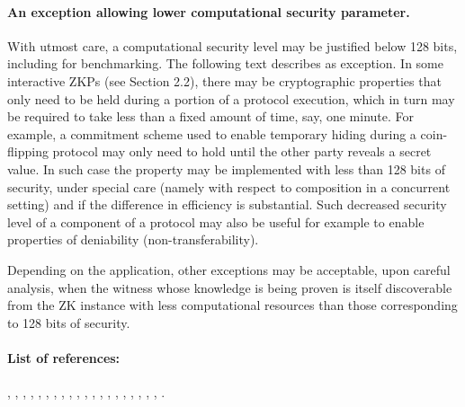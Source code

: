 \paragraph{An exception allowing lower computational security parameter.}
	With utmost care, a computational security level may be justified below 128 bits,
including for benchmarking.
	The following text describes as exception.
	In some interactive ZKPs (see Section 2.2), there may be cryptographic properties that only need to be held during a portion of a protocol execution, which in turn may be required to take less than a fixed amount of time, say, one minute.
	For example, a commitment scheme used to enable temporary hiding during a 
coin-flipping protocol may only need to hold until the other party reveals a secret value.
	In such case the property may be implemented with less than 128 bits of security, 
under special care (namely with respect to composition in a concurrent setting)
and if the difference in efficiency is substantial.
	Such decreased security level of a component of a protocol may also be 
useful for example to enable properties of deniability (non-transferability).

    Depending on the application, other exceptions may be acceptable, upon careful analysis, when the witness whose knowledge is being proven is itself discoverable from the ZK instance with less computational resources than those corresponding to 128 bits of security. 














\paragraph{List of references:}
\cite{2013:tcc:snargs-via-LIPs},
\cite{2016:tcc:IOPs},
\cite{2017:eurocrypt:lattice-based-snargs},
\cite{2016:eurocrypt:efficient-zk-args-for-arithmetic},
\cite{2017:asiacrypt:linear-time-zkps-for-arithmetic},
\cite{2018:asiacrypt:arya-nearly-lineat-time-zkps-for-correct},
\cite{1998:crypto:zkps-for-finite-field-arithmetic},
\cite{2013:QSPs-and-succinct-NIZKs-without-PCPs},
\cite{2015:JACM:delegating-computation-interactive-proofs-for-muggles},
\cite{2010:asiacrypt:short-NIZKPs},
\cite{2018:SP:Doubly-efficient-zkSNARKs-without-trusted-setup},
\cite{2007:stoc:ZK-from-SMPC},
\cite{2012:tcc:On-Efficient-ZK-PCPs},
\cite{1995:crypto:Improved-Efficient-Arguments},
\cite{2008:icalp:interactive-PCP},
\cite{2017:ccs:ligero},
\cite{2000:SIAM:Computationally-Sound-Proofs},
\cite{2016:stoc:Constant-round-Interactive-Proofs-for-Delegating-Computation},
\cite{2018:SP:vRAM},
\cite{2017:SP:vSQL},
\cite{2016:Sec:ZKBoo}.

